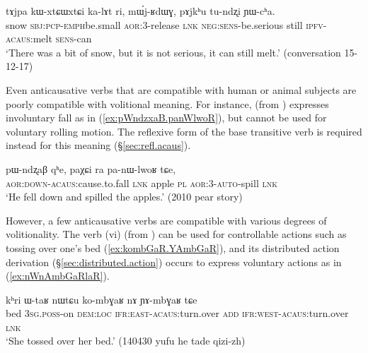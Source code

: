 \begin{exe}
\ex \label{ex:tundzxi.YWcha}
\gll tɤjpa kɯ-xtɕɯ\redp{}xtɕi ka-lɤt ri, mɯ́j-ʁdɯɣ, pɤjkʰu tu-ndʐi ɲɯ-cʰa. \\
snow \textsc{sbj}:\textsc{pcp}-\textsc{emph}\redp{}be.small \textsc{aor}:3\flobv{}-release \textsc{lnk} \textsc{neg}:\textsc{sens}-be.serious still \textsc{ipfv}-\textsc{acaus}:melt \textsc{sens}-can \\
\glt `There was a bit of snow, but it is not serious, it can still melt.' (conversation 15-12-17)
\end{exe} 

Even anticausative verbs that are compatible with human or animal subjects are poorly compatible with volitional meaning. For instance,  (from ) expresses involuntary fall as in (\ref{ex:pWndzxaB.panWlwoR}), but cannot be used for voluntary rolling motion. The reflexive form of the base transitive verb  is required instead for this meaning (§\ref{sec:refl.acaus}).

\begin{exe}
\ex \label{ex:pWndzxaB.panWlwoR}
\gll pɯ-ndʐaβ qʰe, paχɕi ra pa-nɯ-lwoʁ tɕe, \\
\textsc{aor}:\textsc{down}-\textsc{acaus}:cause.to.fall \textsc{lnk} apple \textsc{pl} \textsc{aor}:3\flobv{}-\textsc{auto}-spill \textsc{lnk} \\
\glt `He fell down and spilled the apples.' (2010  pear story)
\end{exe} 

However, a few anticausative verbs are compatible with various degrees of volitionality. The verb  (vi) (from ) can be used for controllable actions such as tossing over one's bed (\ref{ex:kombGaR.YAmbGaR}), and its distributed action derivation (§\ref{sec:distributed.action})  occurs to express voluntary actions as in (\ref{ex:nWnAmbGaRlaR}).

\begin{exe}
\ex \label{ex:kombGaR.YAmbGaR}
\gll kʰri ɯ-taʁ nɯtɕu ko-mbɣaʁ nɤ ɲɤ-mbɣaʁ tɕe \\
bed \textsc{3sg}.\textsc{poss}-on \textsc{dem}:\textsc{loc} \textsc{ifr}:\textsc{east}-\textsc{acaus}:turn.over \textsc{add} \textsc{ifr}:\textsc{west}-\textsc{acaus}:turn.over \textsc{lnk} \\
\glt `She tossed over her bed.' (140430 yufu he tade qizi-zh) 
\end{exe} 

